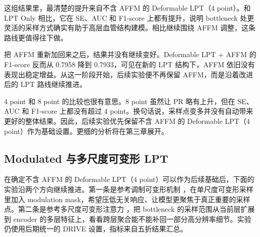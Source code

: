 \documentclass[a4paper,12pt]{article}
\begin{document}
\begin{table}[htbp]
\centering
\caption{可变形 LPT 相关实验结果对比}
\label{tab:deformable_lpt_cn}
\end{table}

这组结果里，最清楚的提升来自不含 AFFM 的 Deformable LPT（4 point）。和 LPT Only 相比，它在 SE、AUC 和 F1-score 上都有提升，说明 bottleneck 处更灵活的采样方式确实有助于高层血管结构建模。相比继续围绕 AFFM 调整，这条路线更值得往下做。

把 AFFM 重新加回来之后，结果并没有继续变好。Deformable LPT + AFFM 的 F1-score 反而从 0.7958 降到 0.7933，可见在新的 LPT 结构下，AFFM 依旧没有表现出稳定增益。从这一阶段开始，后续实验便不再保留 AFFM，而是沿着改进后的 LPT 路线继续推进。

4 point 和 8 point 的比较也很有意思。8 point 虽然让 PR 略有上升，但在 SE、AUC 和 F1-score 上都没有超过 4 point。换句话说，采样点变多并没有自动带来更好的整体结果。因此，后续实验优先保留不含 AFFM 的 Deformable LPT（4 point）作为基础设置。更细的分析将在第三章展开。

\subsection{Modulated 与多尺度可变形 LPT}

在确定不含 AFFM 的 Deformable LPT（4 point）可以作为后续基础后，下面的实验沿两个方向继续推进。第一条是参考调制可变形机制 \cite{zhu2019dcnv2}，在单尺度可变形采样里加入 modulation mask，希望压低无关响应、让模型更聚焦于真正重要的采样点。第二条是参考多尺度可变形注意力 \cite{zhu2021deformabledetr}，把 bottleneck 的采样范围从当前层扩展到 encoder 的多层特征上，看看跨层聚合能不能补回一部分高分辨率细节。实验仍使用后期统一的 DRIVE 设置，指标来自五折结果汇总。
\end{document}
